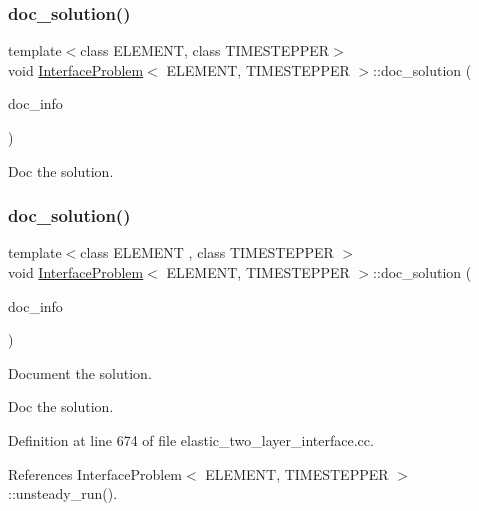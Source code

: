 \subsubsection{\texorpdfstring{doc\+\_\+solution()}{doc\_solution()}\hspace{0.1cm}{\footnotesize\ttfamily [1/2]}}
{\footnotesize\ttfamily template$<$class E\+L\+E\+M\+E\+NT, class T\+I\+M\+E\+S\+T\+E\+P\+P\+ER$>$ \\
void \hyperlink{classInterfaceProblem}{Interface\+Problem}$<$ E\+L\+E\+M\+E\+NT, T\+I\+M\+E\+S\+T\+E\+P\+P\+ER $>$\+::doc\+\_\+solution (\begin{DoxyParamCaption}\item[{Doc\+Info \&}]{doc\+\_\+info }\end{DoxyParamCaption})}



Doc the solution. 

\mbox{\label{classInterfaceProblem_a49714e35e94f7d2af0b6ddd22b851f52}} 
\subsubsection{\texorpdfstring{doc\+\_\+solution()}{doc\_solution()}\hspace{0.1cm}{\footnotesize\ttfamily [2/2]}}
{\footnotesize\ttfamily template$<$class E\+L\+E\+M\+E\+NT , class T\+I\+M\+E\+S\+T\+E\+P\+P\+ER $>$ \\
void \hyperlink{classInterfaceProblem}{Interface\+Problem}$<$ E\+L\+E\+M\+E\+NT, T\+I\+M\+E\+S\+T\+E\+P\+P\+ER $>$\+::doc\+\_\+solution (\begin{DoxyParamCaption}\item[{Doc\+Info \&}]{doc\+\_\+info }\end{DoxyParamCaption})}



Document the solution. 

Doc the solution. 

Definition at line 674 of file elastic\+\_\+two\+\_\+layer\+\_\+interface.\+cc.



References Interface\+Problem$<$ E\+L\+E\+M\+E\+N\+T, T\+I\+M\+E\+S\+T\+E\+P\+P\+E\+R $>$\+::unsteady\+\_\+run().



